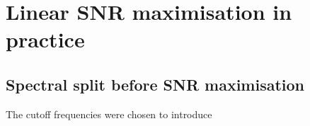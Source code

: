 \section{Linear SNR maximisation in practice}





\subsection{Spectral split before SNR maximisation}

The cutoff frequencies were chosen to introduce 
